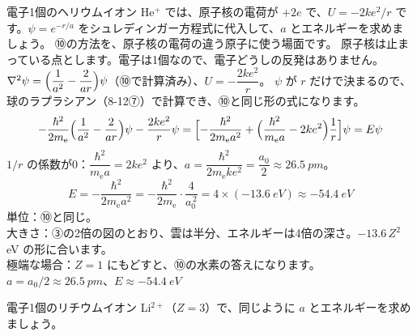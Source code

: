 \label{ph:原-7:ex4}
\begin{phreidai}
電子1個のヘリウムイオン He$^+$ では、原子核の電荷が $+2e$ で、$U=-2ke^2/r$ です。$\psi=e^{-r/a}$ をシュレディンガー方程式に代入して、$a$ とエネルギーを求めましょう。
\phbamen
⑩の方法を、原子核の電荷の違う原子に使う場面です。
\phmushi
原子核は止まっている点とします。電子は1個なので、電子どうしの反発はありません。
\phzu
$\nabla^2\psi=\Bigl(\dfrac{1}{a^2}-\dfrac{2}{ar}\Bigr)\psi$（⑩で計算済み）、$U=-\dfrac{2ke^2}{r}$。
\phriyu
$\psi$ が $r$ だけで決まるので、球のラプラシアン（8-12⑦）で計算でき、⑩と同じ形の式になります。
\phtateru
\[ -\frac{\hbar^2}{2m_{\mathrm e}}\Bigl(\frac{1}{a^2}-\frac{2}{ar}\Bigr)\psi-\frac{2ke^2}{r}\psi=\Bigl[-\frac{\hbar^2}{2m_{\mathrm e}a^2}+\Bigl(\frac{\hbar^2}{m_{\mathrm e}a}-2ke^2\Bigr)\frac1r\Bigr]\psi=E\psi \]
\phtoku
$1/r$ の係数が0：$\dfrac{\hbar^2}{m_{\mathrm e}a}=2ke^2$ より、$a=\dfrac{\hbar^2}{2m_{\mathrm e}ke^2}=\dfrac{a_0}{2}\approx\qty{26.5}{pm}$。
\[ E=-\frac{\hbar^2}{2m_{\mathrm e}a^2}=-\frac{\hbar^2}{2m_{\mathrm e}}\cdot\frac{4}{a_0^{\,2}}=4\times(\qty{-13.6}{eV})\approx\qty{-54.4}{eV} \]
\phtashikame
単位：⑩と同じ。\\
大きさ：③の2倍の図のとおり、雲は半分、エネルギーは4倍の深さ。$-13.6\,Z^2$ eV の形に合います。\\
極端な場合：$Z=1$ にもどすと、⑩の水素の答えになります。
\kotae $a=a_0/2\approx\qty{26.5}{pm}$、$E\approx\qty{-54.4}{eV}$
\end{phreidai}
\begin{jibun}
電子1個のリチウムイオン Li$^{2+}$（$Z=3$）で、同じように $a$ とエネルギーを求めましょう。
\end{jibun}

